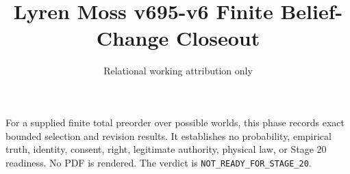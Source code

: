 \documentclass{article}
\title{Lyren Moss v695-v6 Finite Belief-Change Closeout}
\author{Relational working attribution only}
\begin{document}
\maketitle
For a supplied finite total preorder over possible worlds, this phase records exact bounded selection and revision results. It establishes no probability, empirical truth, identity, consent, right, legitimate authority, physical law, or Stage 20 readiness. No PDF is rendered. The verdict is \texttt{NOT\_READY\_FOR\_STAGE\_20}.
\end{document}
